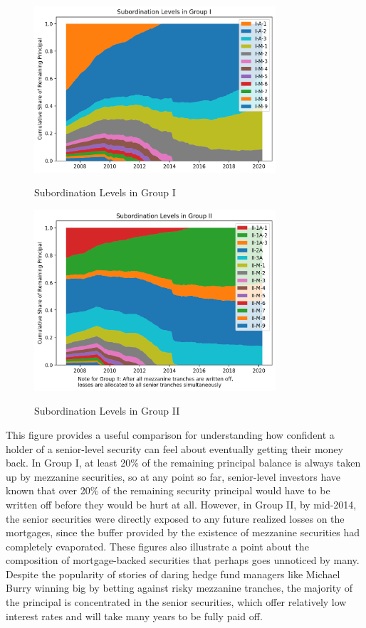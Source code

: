 \documentclass[12pt]{article}
\begin{document}
\begin{figure}[h]
	\centering
	\caption{Subordination Levels in Group I}
	\includegraphics[width=0.8\textwidth]{../figures/stackplot_share_of_principal_group_i}
	\label{fig:stackplot_share_of_principal_group_i}
\end{figure}

\begin{figure}[h]
	\centering
	\caption{Subordination Levels in Group II}
	\includegraphics[width=0.8\textwidth]{../figures/stackplot_share_of_principal_group_ii}
	\label{fig:stackplot_share_of_principal_group_ii}
\end{figure}

This figure provides a useful comparison for understanding how confident a holder of a senior-level security can feel about eventually getting their money back. In Group I, at least 20\% of the remaining principal balance is always taken up by mezzanine securities, so at any point so far, senior-level investors have known that over 20\% of the remaining security principal would have to be written off before they would be hurt at all. However, in Group II, by mid-2014, the senior securities were directly exposed to any future realized losses on the mortgages, since the buffer provided by the existence of mezzanine securities had completely evaporated. These figures also illustrate a point about the composition of mortgage-backed securities that perhaps goes unnoticed by many. Despite the popularity of stories of daring hedge fund managers like Michael Burry winning big by betting against risky mezzanine tranches, the majority of the principal is concentrated in the senior securities, which offer relatively low interest rates and will take many years to be fully paid off.
\end{document}
